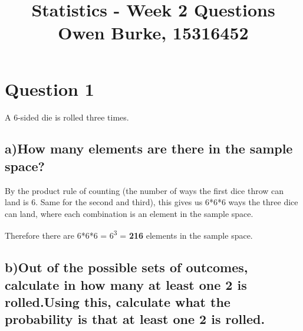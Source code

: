 \documentclass{report}
\title{\textbf{Statistics - Week 2 Questions}\\Owen Burke, 15316452}
\begin{document}
	\maketitle
	\section*{\hfil Question 1 \hfil}
	A 6-sided die is rolled three times.
		\subsection*{a)How many elements are there in the sample space?}
		
		By the product rule of counting (the number of ways the first dice throw can land is 6. Same for the second and third), this gives us 6*6*6 ways the three dice can land, where each combination is an element in the sample space.
		
		\begin{center}
			Therefore there are 6*6*6 = 6\textsuperscript{3} = \textbf{216} elements in the sample space.
		\end{center}
	
		\subsection*{b)Out of the possible sets of outcomes, calculate in how many at least one 2 is rolled.Using this, calculate what the probability is that at least one 2 is rolled.}
		
\end{document}
